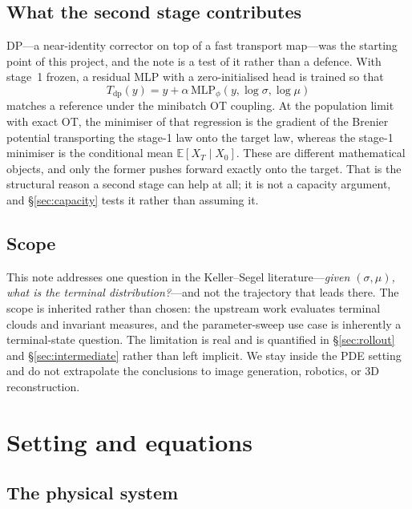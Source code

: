 ﻿\documentclass[11pt,a4paper]{article}
\newcommand{\DP}{\textsc{DP}}
\begin{document}
\subsection{What the second stage contributes}

\DP{}---a near-identity corrector on top of a fast transport map---was the starting point of
this project, and the note is a test of it rather than a defence. With stage~1 frozen, a
residual MLP with a zero-initialised head is trained so that
\begin{equation}
T_{\text{dp}}(y)=y+\alpha\,\mathrm{MLP}_\phi(y,\log\sigma,\log\mu)
\label{eq:dp-map}
\end{equation}
matches a reference under the minibatch OT coupling. At the population limit with exact OT, the
minimiser of that regression is the gradient of the Brenier potential transporting the stage-1
law onto the target law, whereas the stage-1 minimiser is the conditional mean
$\mathbb{E}[X_T\mid X_0]$. These are different mathematical objects, and only the former pushes
forward exactly onto the target. That is the structural reason a second stage can help at all;
it is not a capacity argument, and \S\ref{sec:capacity} tests it rather than assuming it.

\subsection{Scope}

This note addresses one question in the Keller--Segel literature---\emph{given $(\sigma,\mu)$,
what is the terminal distribution?}---and not the trajectory that leads there. The scope is
inherited rather than chosen: the upstream work evaluates terminal clouds and invariant
measures, and the parameter-sweep use case is inherently a terminal-state question. The
limitation is real and is quantified in \S\ref{sec:rollout} and \S\ref{sec:intermediate} rather
than left implicit. We stay inside the PDE setting and do not extrapolate the conclusions to
image generation, robotics, or 3D reconstruction.

\section{Setting and equations}

\subsection{The physical system}
\end{document}
